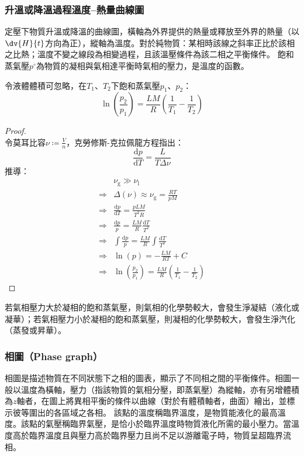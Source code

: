 \documentclass[a4paper,12pt]{report}
\begin{document}
\subsubsection{升溫或降溫過程溫度–熱量曲線圖}
定壓下物質升溫或降溫的曲線圖，橫軸為外界提供的熱量或釋放至外界的熱量（以$\dv{H}{t}$方向為正），縱軸為溫度。對於純物質：某相時該線之斜率正比於該相之比熱；溫度不變之線段為相變過程，且該溫壓條件為該二相之平衡條件。
飽和蒸氣壓$p^\circ$為物質的凝相與氣相達平衡時氣相的壓力，是溫度的函數。

令液體體積可忽略，在$T_1$、$T_2$下飽和蒸氣壓$p_1$、$p_2$：
\[\ln\left(\frac{p_2}{p_1}\right)=\frac{LM}{R}\left(\frac{1}{T_1}-\frac{1}{T_2}\right)\]
\begin{proof}\mbox{}\\
令莫耳比容$\nu\coloneq\frac{V}{n}$，克勞修斯-克拉佩龍方程指出：
\[\frac{\mathrm{d}p}{\mathrm{d}T}=\frac{L}{T \Delta \nu}\]
推導：
\[\begin{aligned}
&\nu_{\text{g}}\gg\nu_{\text{l}}\\
\Rightarrow &\Delta \left(\nu\right)\approx \nu_{\text{g}}=\frac{RT}{pM}\\
\Rightarrow &\frac{\mathrm{d}p}{\mathrm{d}T}=\frac{pLM}{T^2 R}\\
\Rightarrow &\frac{\mathrm{d}p}{p}=\frac{LM}{R}\frac{\mathrm{d}T}{T^2}\\
\Rightarrow &\int\frac{\mathrm{d}p}{p}=\frac{LM}{R}\int\frac{\mathrm{d}T}{T^2}\\
\Rightarrow &\ln(p)=-\frac{LM}{RT}+C\\
\Rightarrow &\ln\left(\frac{p_2}{p_1}\right)=\frac{LM}{R}\left(\frac{1}{T_1}-\frac{1}{T_2}\right)
\end{aligned}\]
\end{proof}

若氣相壓力大於凝相的飽和蒸氣壓，則氣相的化學勢較大，會發生淨凝結（液化或凝華）；若氣相壓力小於凝相的飽和蒸氣壓，則凝相的化學勢較大，會發生淨汽化（蒸發或昇華）。
\subsubsection{相圖（Phase graph）}
相圖是描述物質在不同狀態下之相的圖表，顯示了不同相之間的平衡條件。相圖一般以溫度為橫軸，壓力（指該物質的氣相分壓，即蒸氣壓）為縱軸，亦有另增體積為$z$軸者，在圖上將異相平衡的條件以曲線（對於有體積軸者，曲面）繪出，並標示彼等圍出的各區域之各相。
該點的溫度稱臨界溫度，是物質能液化的最高溫度。該點的氣壓稱臨界氣壓，是恰小於臨界溫度時物質液化所需的最小壓力。當溫度高於臨界溫度且與壓力高於臨界壓力且尚不足以游離電子時，物質呈超臨界流相。
\end{document}
